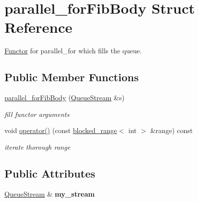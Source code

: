 \hypertarget{structparallel__forFibBody}{}\section{parallel\+\_\+for\+Fib\+Body Struct Reference}
\label{structparallel__forFibBody}


\hyperlink{structFunctor}{Functor} for parallel\+\_\+for which fills the queue.  


\subsection*{Public Member Functions}
\begin{DoxyCompactItemize}
\item 
\hypertarget{structparallel__forFibBody_a1bfd90802c55a7e8c024f56268c9feb2}{}\hyperlink{structparallel__forFibBody_a1bfd90802c55a7e8c024f56268c9feb2}{parallel\+\_\+for\+Fib\+Body} (\hyperlink{structQueueStream}{Queue\+Stream} \&s)\label{structparallel__forFibBody_a1bfd90802c55a7e8c024f56268c9feb2}

\begin{DoxyCompactList}\small\item\em fill functor arguments \end{DoxyCompactList}\item 
\hypertarget{structparallel__forFibBody_a1038c65b3bf2cdbd5703ceb86bac4c6b}{}void \hyperlink{structparallel__forFibBody_a1038c65b3bf2cdbd5703ceb86bac4c6b}{operator()} (const \hyperlink{classtbb_1_1blocked__range}{blocked\+\_\+range}$<$ int $>$ \&range) const \label{structparallel__forFibBody_a1038c65b3bf2cdbd5703ceb86bac4c6b}

\begin{DoxyCompactList}\small\item\em iterate thorough range \end{DoxyCompactList}\end{DoxyCompactItemize}
\subsection*{Public Attributes}
\begin{DoxyCompactItemize}
\item 
\hypertarget{structparallel__forFibBody_a972b8ba7f21e89ac20d9f10141eaa552}{}\hyperlink{structQueueStream}{Queue\+Stream} \& {\bfseries my\+\_\+stream}\label{structparallel__forFibBody_a972b8ba7f21e89ac20d9f10141eaa552}

\end{DoxyCompactItemize}


